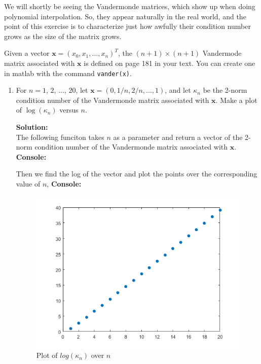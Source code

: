 \documentclass[12pt]{article}
\makeatletter
\theoremstyle{homework}
\newenvironment{exercise}[1]
{\def\@currentlabel{#1}\exercisecore}
{\endexercisecore}
\newcommand{\localhead}[1]{\par\smallskip\noindent\textbf{#1}\nobreak\\}%
\newcommand\solution{\localhead{Solution:}}
\def\vx{\mathbf x}
\makeatother
\begin{document}
\begin{exercise}{Supplemental 3}
We will shortly be seeing the Vandermonde matrices,
which show up when doing polynomial interpolation.
So, they appear naturally in the real world, and
the point of this exercise is to characterize just
how awfully their condition number grows as the
size of the matrix grows.

Given a vector $\vx=(x_0,x_1,\ldots,x_n)^T$, the
$(n+1)\times (n+1)$ Vandermode matrix associated
with $\vx$ is defined on page 181 in your text.
You can create one in matlab with the command {\tt vander(x)}.
\begin{enumerate}
\item For $n=1$, $2$, $\ldots$, $20$, let $\vx=(0,1/n,2/n,\ldots, 1)$,
and let $\kappa_n$ be the 2-norm condition number of the
Vandermonde matrix associated with $\vx$.  Make
a plot of $\log(\kappa_n)$ versus $n$.\\

\solution The following funciton takes $n$ as a parameter and return a vector of the 2-norm condition number of the
Vandermonde matrix associated with $\vx$.\\

\textbf{Console:}
\begin{center}

\end{center}

Then we find the log of the vector and plot the points over the corresponding value of $n$,
\textbf{Console:}
\begin{center}

\end{center}

\begin{figure}[h]
  \caption{Plot of $log(\kappa_n)$ over $n$}
  \includegraphics[width = .60\textwidth]{logvander.png}  
  \centering
\end{figure}










\end{enumerate}
\end{exercise}
\end{document}
